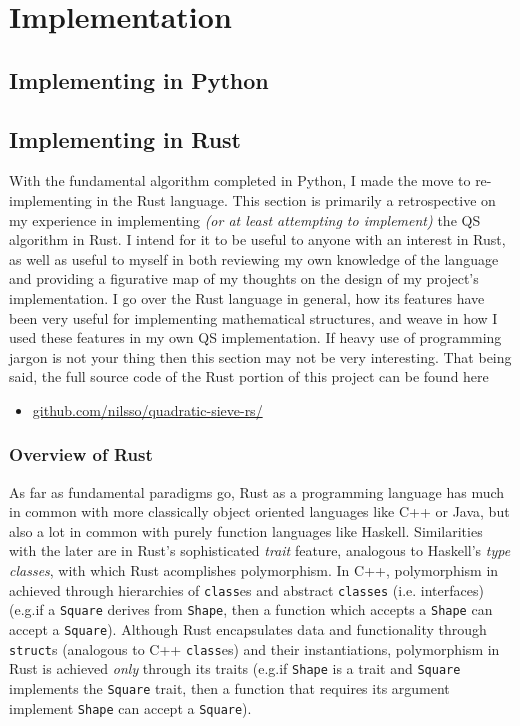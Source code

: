 \documentclass{report}
\begin{document}
\chapter{Implementation}

\section{Implementing in Python}

\section{Implementing in Rust}

With the fundamental algorithm completed in Python, I made the move to
re-implementing in the Rust language. This section is primarily a
retrospective on my experience in implementing \emph{(or at least
attempting to implement)} the QS algorithm in Rust.
I intend for it to be useful to anyone with an interest in Rust, as well as
useful to myself in both reviewing my own knowledge of the language and
providing a figurative map of my thoughts on the design of my project's
implementation.
I go over the Rust language
in general, how its features have been very useful for implementing mathematical
structures, and weave in how I used these features in my own QS implementation.
If heavy use of programming jargon is not your thing then this section may not
be very interesting.
That being said, the full source code of the Rust portion of this project
can be found here
\begin{itemize}
    \item \href{https://github.com/nilsso/quadratic-sieve-rs/tree/main/src}{github.com/nilsso/quadratic-sieve-rs/}
\end{itemize}

\subsection{Overview of Rust}\label{s:rust-overview}

As far as fundamental paradigms go, Rust as a programming language has much in
common with more classically object oriented languages like C++ or Java, but
also a lot in common with purely function languages like Haskell.
Similarities with the later are in Rust's sophisticated \emph{trait} feature,
analogous to Haskell's \emph{type classes}, with which Rust acomplishes
polymorphism.
In C++, polymorphism in achieved through hierarchies of \Verb+class+es and
abstract \Verb+classes+ (i.e. interfaces)
(e.g.\@ if a \Verb+Square+ derives from \Verb+Shape+, then a function which
accepts a \Verb+Shape+ can accept a \Verb+Square+).
Although Rust encapsulates data and functionality through \Verb+struct+s
(analogous to C++ \Verb+class+es) and their instantiations,
polymorphism in Rust is achieved \emph{only} through its traits
(e.g.\@ if \Verb+Shape+ is a trait and \Verb+Square+ implements the \Verb+Square+
trait, then a function that requires its argument implement \Verb+Shape+ can
accept a \Verb+Square+).
\end{document}
